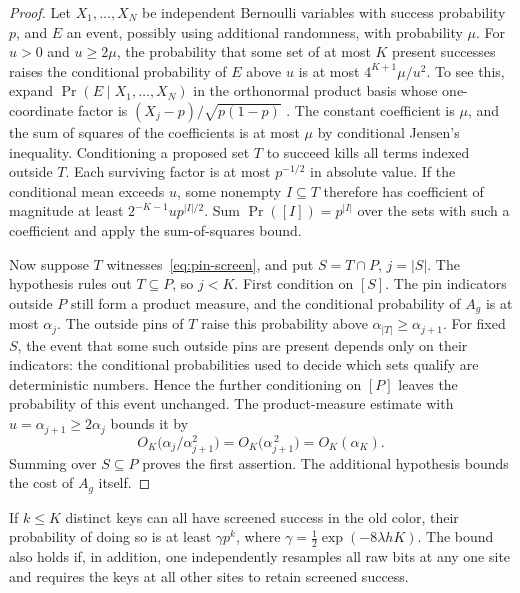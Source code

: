 \begin{proof}
Let $X_1,\ldots,X_N$ be independent Bernoulli variables with success
probability $p$, and $E$ an event, possibly using additional randomness,
with probability $\mu$. For $u>0$ and $u\ge2\mu$, the probability that
some set of at most $K$ present successes raises the conditional
probability of $E$ above $u$ is at most $4^{K+1}\mu/u^2$. To see this,
expand $\Pr(E\mid X_1,\ldots,X_N)$ in the orthonormal product basis
whose one-coordinate factor is $(X_j-p)/\sqrt{p(1-p)}$
\cite[Sections~8.1 and~8.4]{Odonnell2014}. The constant
coefficient is $\mu$, and the sum of squares of the coefficients is at
most $\mu$ by conditional Jensen's inequality. Conditioning a proposed
set $T$ to succeed kills all terms indexed outside $T$. Each surviving
factor is at most $p^{-1/2}$ in absolute value. If the conditional
mean exceeds $u$, some nonempty $I\subseteq T$ therefore has coefficient
of magnitude at least $2^{-K-1}u p^{|I|/2}$. Sum
$\Pr([I])=p^{|I|}$ over the sets with such a coefficient and apply the
sum-of-squares bound.

Now suppose \(T\) witnesses~\eqref{eq:pin-screen}, and put
\(S=T\cap P\), \(j=|S|\). The hypothesis rules out \(T\subseteq P\),
so \(j<K\). First condition on \([S]\). The pin indicators outside
\(P\) still form a product measure, and the conditional probability
of \(A_g\) is at most \(\alpha_j\). The outside pins of \(T\) raise
this probability above \(\alpha_{|T|}\ge\alpha_{j+1}\).
For fixed \(S\), the event that some such outside pins are present
depends only on their indicators: the conditional probabilities
used to decide which sets qualify are deterministic numbers. Hence
the further conditioning on \([P]\) leaves the probability of this
event unchanged. The product-measure estimate with
\(u=\alpha_{j+1}\ge2\alpha_j\) bounds it by
\[
 O_K\bigl(\alpha_j/\alpha_{j+1}^2\bigr)
   =O_K\bigl(\alpha_{j+1}^{\,2}\bigr)=O_K(\alpha_K).
\]
Summing over \(S\subseteq P\) proves the first assertion. The
additional hypothesis bounds the cost of \(A_g\) itself.
\end{proof}

\begin{lemma}\label{lem:joint-gates}
If $k\le K$ distinct keys can all have screened success in the old
color, their probability of doing so is at least $\gamma p^k$, where
$\gamma=\tfrac12\exp(-8\lambda hK)$. The bound also holds if, in
addition, one independently resamples all raw bits at any one site and
requires the keys at all other sites to retain screened success.
\end{lemma}

